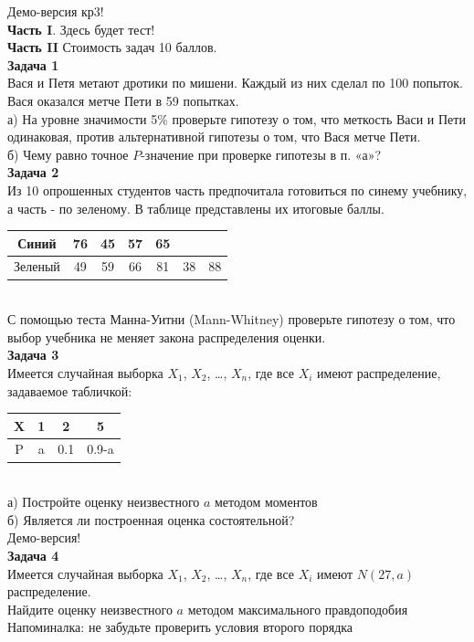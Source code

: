 \documentclass[12pt, a4paper]{article}\usepackage[]{graphicx}\usepackage[]{color}
\begin{document}
Демо-версия кр3! \\
\textbf{Часть I}. Здесь будет тест! \\
\textbf{Часть II} Стоимость задач 10 баллов. \\

\textbf{Задача 1} \\
Вася и Петя метают дротики по мишени. Каждый из них сделал
по 100 попыток. Вася оказался метче Пети в 59 попытках. \\
а) На уровне
значимости 5\% проверьте гипотезу о том, что меткость Васи и Пети
одинаковая, против альтернативной гипотезы о том, что Вася метче
Пети. \\
б) Чему равно точное $P$-значение при проверке гипотезы в п. «а»? \\

\textbf{Задача 2} \\ %
Из 10 опрошенных студентов часть предпочитала готовиться по
синему учебнику, а часть - по зеленому. В таблице представлены их
итоговые баллы.  \\
\begin{tabular}{c|cccccc}
  Синий & 76 & 45 & 57 & 65 &  &  \\
  \hline
  Зеленый & 49 & 59 & 66 & 81 & 38 & 88 \\
\end{tabular} \\
С помощью теста Манна-Уитни (Mann-Whitney) проверьте гипотезу о
том, что выбор учебника не меняет закона распределения оценки. \\

\textbf{Задача 3} \\ %
Имеется случайная выборка $X_{1}$, $X_{2}$, \ldots, $X_{n}$, где все $X_{i}$ имеют распределение, задаваемое табличкой: \\
\begin{tabular}{c|ccc}
X & 1 & 2 & 5 \\
\hline
P & a & 0.1 & 0.9-a \\
\end{tabular} \\
а) Постройте оценку неизвестного $a$ методом моментов \\
б) Является ли построенная оценка состоятельной? \\

Демо-версия! \\

\textbf{Задача 4} \\ %
Имеется случайная выборка $X_{1}$, $X_{2}$, \ldots, $X_{n}$, где все $X_{i}$ имеют $N(27,a)$ распределение. \\
Найдите оценку неизвестного $a$ методом максимального правдоподобия \\
Напоминалка: не забудьте проверить условия второго порядка \\
\end{document}
